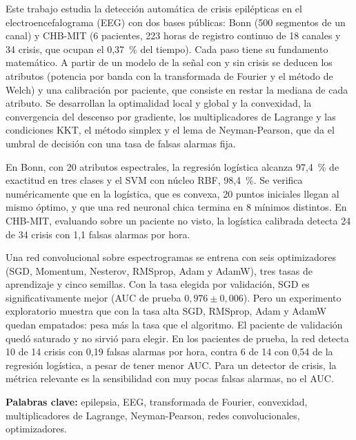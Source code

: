 Este trabajo estudia la detección automática de crisis epilépticas en el electroencefalograma (EEG) con dos bases
públicas: Bonn (500 segmentos de un canal) y CHB-MIT (6 pacientes, 223 horas de registro continuo de 18 canales y 34
crisis, que ocupan el 0,37~\% del tiempo). Cada paso tiene su fundamento matemático. A partir de un modelo de la señal
con y sin crisis se deducen los atributos (potencia por banda con la transformada de Fourier y el método de Welch) y una
calibración por paciente, que consiste en restar la mediana de cada atributo. Se desarrollan la optimalidad local y global
y la convexidad, la convergencia del descenso por gradiente, los multiplicadores de Lagrange y las condiciones KKT, el
método simplex y el lema de Neyman-Pearson, que da el umbral de decisión con una tasa de falsas alarmas fija.

En Bonn, con 20 atributos espectrales, la regresión logística alcanza 97,4~\% de exactitud en tres clases y el SVM con núcleo
RBF, 98,4~\%. Se verifica numéricamente que en la logística, que es convexa, 20 puntos iniciales llegan al mismo óptimo, y que
una red neuronal chica termina en 8 mínimos distintos. En CHB-MIT, evaluando sobre un paciente no visto, la logística
calibrada detecta 24 de 34 crisis con 1,1 falsas alarmas por hora.

Una red convolucional sobre espectrogramas se entrena con seis optimizadores (SGD, Momentum, Nesterov, RMSprop, Adam y
AdamW), tres tasas de aprendizaje y cinco semillas. Con la tasa elegida por validación, SGD es significativamente mejor
(AUC de prueba $0{,}976 \pm 0{,}006$). Pero un experimento exploratorio muestra que con la tasa alta SGD, RMSprop, Adam y AdamW
quedan empatados: pesa más la tasa que el algoritmo. El paciente de validación quedó saturado y no sirvió para elegir. En los
pacientes de prueba, la red detecta 10 de 14 crisis con 0,19 falsas alarmas por hora, contra 6 de 14 con 0,54 de la regresión
logística, a pesar de tener menor AUC. Para un detector de crisis, la métrica relevante es la sensibilidad con muy pocas falsas
alarmas, no el AUC.

\medskip
\noindent\textbf{Palabras clave:} epilepsia, EEG, transformada de Fourier, convexidad, multiplicadores de Lagrange,
Neyman-Pearson, redes convolucionales, optimizadores.
